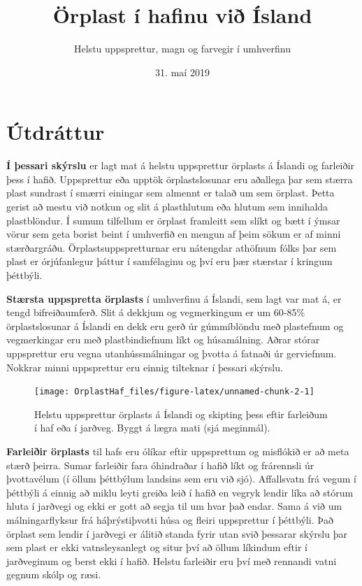\documentclass[icelandic,]{book}
\title{{Örplast í hafinu við Ísland}}
\subtitle{{ Helstu uppsprettur, magn og farvegir í umhverfinu}}
\author{}
\date{31. maí 2019}
\begin{document}
\maketitle

{
\setcounter{tocdepth}{1}
\tableofcontents
}
\listoftables
\listoffigures
\hypertarget{utdrattur}{%
\chapter*{Útdráttur}\label{utdrattur}}

\textbf{Í þessari skýrslu} er lagt mat á helstu uppsprettur örplasts á Íslandi og farleiðir þess í hafið. Uppsprettur eða upptök örplastslosunar eru aðallega þar sem stærra plast sundrast í smærri einingar sem almennt er talað um sem örplast. Þetta gerist að mestu við notkun og slit á plasthlutum eða hlutum sem innihalda plastblöndur. Í sumum tilfellum er örplast framleitt sem slíkt og bætt í ýmsar vörur sem geta borist beint í umhverfið en mengun af þeim sökum er af minni stærðargráðu. Örplastsuppspretturnar eru nátengdar athöfnum fólks þar sem plast er órjúfanlegur þáttur í samfélaginu og því eru þær stærstar í kringum þéttbýli.

\textbf{Stærsta uppspretta örplasts} í umhverfinu á Íslandi, sem lagt var mat á, er tengd bifreiðaumferð. Slit á dekkjum og vegmerkingum er um 60-85\% örplastslosunar á Íslandi en dekk eru gerð úr gúmmíblöndu með plastefnum og vegmerkingar eru með plastbindiefnum líkt og húsamálning. Aðrar stórar uppsprettur eru vegna utanhússmálningar og þvotta á fatnaði úr gerviefnum. Nokkrar minni uppsprettur eru einnig tilteknar í þessari skýrslu.

\begin{figure}

{\centering \texttt{[image: OrplastHaf\_files/figure-latex/unnamed-chunk-2-1]} 

}

\caption{Helstu uppsprettur örplasts á Íslandi og skipting þess eftir farleiðum í haf eða í jarðveg. Byggt á lægra mati (sjá meginmál).}\label{fig:unnamed-chunk-2}
\end{figure}

\textbf{Farleiðir örplasts} til hafs eru ólíkar eftir uppsprettum og misflókið er að meta stærð þeirra. Sumar farleiðir fara óhindraðar í hafið líkt og frárennsli úr þvottavélum (í öllum þéttbýlum landsins sem eru við sjó). Affallsvatn frá vegum í þéttbýli á einnig að miklu leyti greiða leið í hafið en vegryk lendir líka að stórum hluta í jarðvegi og ekki er gott að segja til um hvar það endar. Sama á við um málningarflyksur frá háþrýstiþvotti húsa og fleiri uppsprettur í þéttbýli. Það örplast sem lendir í jarðvegi er álitið standa fyrir utan svið þessarar skýrslu þar sem plast er ekki vatnsleysanlegt og situr því að öllum líkindum eftir í jarðveginum og berst ekki í hafið. Helstu farleiðir eru því með rennandi vatni gegnum skólp og ræsi.
\end{document}

